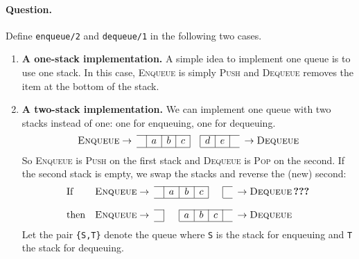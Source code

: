 \paragraph{Question.} Define \texttt{enqueue/2} and
\texttt{dequeue/1} in the following two cases.
\begin{enumerate}

  \item \textbf{A one-stack implementation.} A simple idea to
    implement one queue is to use one stack. In this case,
    \textsc{Enqueue} is simply \textsc{Push} and \textsc{Dequeue}
    removes the item at the bottom of the stack.

  \item \textbf{A two-stack implementation.} We can implement one
    queue with two stacks instead of one: one for enqueuing, one for
    dequeuing.
    \[
    \begin{array}{r@{\;}cc|c|c|c|c|c|c|cc@{\;}l}
      \cline{3-6}\cline{8-10}
      \textsc{Enqueue} & \rightarrow & & a & b & c & & d & e & &
      \rightarrow & \textsc{Dequeue}\\
      \cline{3-6}\cline{8-10}
    \end{array}
    \]
    \noindent So \textsc{Enqueue} is \textsc{Push} on the first stack
    and \textsc{Dequeue} is \textsc{Pop} on the second. If the second
    stack is empty, we swap the stacks and reverse the (new) second:
    \[
    \begin{array}{lr@{\;}cc|c|c|c|c|cc@{\;}l}
      \cline{4-7}\cline{9-9}
      \text{If} & \textsc{Enqueue} & \rightarrow & & a & b & c & & &
      \rightarrow & \textsc{Dequeue} \, \textbf{???}\\
      \cline{4-7}\cline{9-9}\\
      \cline{4-4}\cline{6-9}
      \text{then} & \textsc{Enqueue} & \rightarrow & & & a & b & c & &
      \rightarrow & \textsc{Dequeue}\\
      \cline{4-4}\cline{6-9}
    \end{array}
    \]
    \noindent Let the pair \texttt{\{S,T\}} denote the queue where
    \texttt{S} is the stack for enqueuing and \texttt{T} the stack for
    dequeuing.

\end{enumerate}
